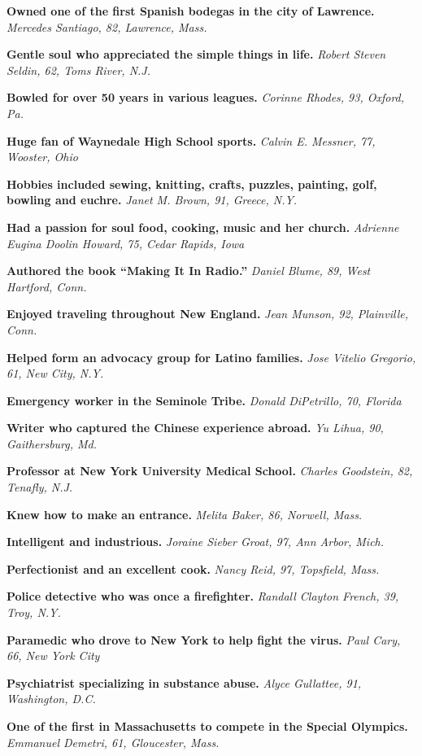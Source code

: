\textbf{Owned one of the first Spanish bodegas in the city of Lawrence.}
\emph{Mercedes Santiago, 82, Lawrence, Mass.}

\textbf{Gentle soul who appreciated the simple things in life.}
\emph{Robert Steven Seldin, 62, Toms River, N.J.}

\textbf{Bowled for over 50 years in various leagues.} \emph{Corinne
Rhodes, 93, Oxford, Pa.}

\textbf{Huge fan of Waynedale High School sports.} \emph{Calvin E.
Messner, 77, Wooster, Ohio}

\textbf{Hobbies included sewing, knitting, crafts, puzzles, painting,
golf, bowling and euchre.} \emph{Janet M. Brown, 91, Greece, N.Y.}

\textbf{Had a passion for soul food, cooking, music and her church.}
\emph{Adrienne Eugina Doolin Howard, 75, Cedar Rapids, Iowa}

\textbf{Authored the book ``Making It In Radio.''} \emph{Daniel Blume,
89, West Hartford, Conn.}

\textbf{Enjoyed traveling throughout New England.} \emph{Jean Munson,
92, Plainville, Conn.}

\textbf{Helped form an advocacy group for Latino families.} \emph{Jose
Vitelio Gregorio, 61, New City, N.Y.}

\textbf{Emergency worker in the Seminole Tribe.} \emph{Donald
DiPetrillo, 70, Florida}

\textbf{Writer who captured the Chinese experience abroad.} \emph{Yu
Lihua, 90, Gaithersburg, Md.}

\textbf{Professor at New York University Medical School.} \emph{Charles
Goodstein, 82, Tenafly, N.J.}

\textbf{Knew how to make an entrance.} \emph{Melita Baker, 86, Norwell,
Mass.}

\textbf{Intelligent and industrious.} \emph{Joraine Sieber Groat, 97,
Ann Arbor, Mich.}

\textbf{Perfectionist and an excellent cook.} \emph{Nancy Reid, 97,
Topsfield, Mass.}

\textbf{Police detective who was once a firefighter.} \emph{Randall
Clayton French, 39, Troy, N.Y.}

\textbf{Paramedic who drove to New York to help fight the virus.}
\emph{Paul Cary, 66, New York City}

\textbf{Psychiatrist specializing in substance abuse.} \emph{Alyce
Gullattee, 91, Washington, D.C.}

\textbf{One of the first in Massachusetts to compete in the Special
Olympics.} \emph{Emmanuel Demetri, 61, Gloucester, Mass.}

